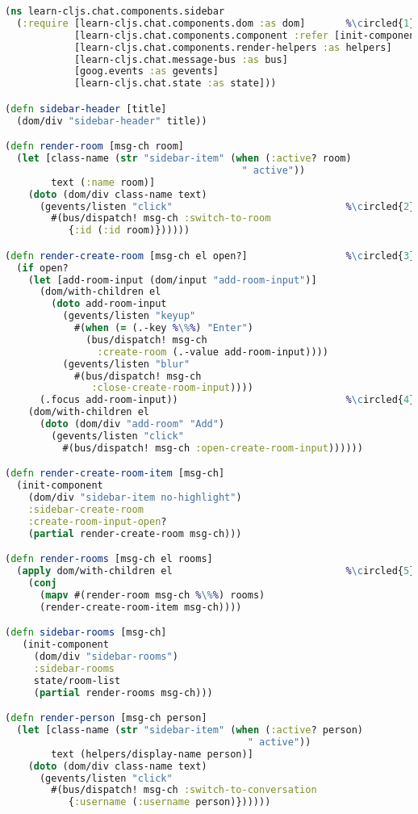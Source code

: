 \documentclass[10pt,twoside,openright]{memoir}
\newcommand*\circled[1]{\tikz[baseline=(char.base)]{
            \node[shape=circle,draw,inner sep=1pt] (char) {#1};}}
\begin{document}
\begin{lstlisting}[language=Clojure, caption={chat/components/sidebar.cljs}]
(ns learn-cljs.chat.components.sidebar
  (:require [learn-cljs.chat.components.dom :as dom]       %\circled{1}%
            [learn-cljs.chat.components.component :refer [init-component]]
            [learn-cljs.chat.components.render-helpers :as helpers]
            [learn-cljs.chat.message-bus :as bus]
            [goog.events :as gevents]
            [learn-cljs.chat.state :as state]))

(defn sidebar-header [title]
  (dom/div "sidebar-header" title))

(defn render-room [msg-ch room]
  (let [class-name (str "sidebar-item" (when (:active? room)
                                         " active"))
        text (:name room)]
    (doto (dom/div class-name text)
      (gevents/listen "click"                              %\circled{2}%
        #(bus/dispatch! msg-ch :switch-to-room
           {:id (:id room)})))))

(defn render-create-room [msg-ch el open?]                 %\circled{3}%
  (if open?
    (let [add-room-input (dom/input "add-room-input")]
      (dom/with-children el
        (doto add-room-input
          (gevents/listen "keyup"
            #(when (= (.-key %\%%) "Enter")
              (bus/dispatch! msg-ch
                :create-room (.-value add-room-input))))
          (gevents/listen "blur"
            #(bus/dispatch! msg-ch
               :close-create-room-input))))
      (.focus add-room-input))                             %\circled{4}%
    (dom/with-children el
      (doto (dom/div "add-room" "Add")
        (gevents/listen "click"
          #(bus/dispatch! msg-ch :open-create-room-input))))))

(defn render-create-room-item [msg-ch]
  (init-component
    (dom/div "sidebar-item no-highlight")
    :sidebar-create-room
    :create-room-input-open?
    (partial render-create-room msg-ch)))

(defn render-rooms [msg-ch el rooms]
  (apply dom/with-children el                              %\circled{5}%
    (conj
      (mapv #(render-room msg-ch %\%%) rooms)
      (render-create-room-item msg-ch))))

(defn sidebar-rooms [msg-ch]
   (init-component
     (dom/div "sidebar-rooms")
     :sidebar-rooms
     state/room-list
     (partial render-rooms msg-ch)))

(defn render-person [msg-ch person]
  (let [class-name (str "sidebar-item" (when (:active? person)
                                          " active"))
        text (helpers/display-name person)]
    (doto (dom/div class-name text)
      (gevents/listen "click"
        #(bus/dispatch! msg-ch :switch-to-conversation
           {:username (:username person)})))))


\end{lstlisting}
\end{document}
